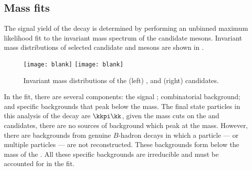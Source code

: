 \subsection{Mass fits}
\label{sec:dsphi:fit}

The signal yield of the decay \btodsphi is determined by performing an unbinned maximum likelihood
fit to the invariant mass spectrum of the candidate \Bp mesons.
Invariant mass distributions of
selected candidate \Ds and \phii mesons are shown in .

\begin{figure}
  \begin{center}
    \texttt{[image: blank]}
    \texttt{[image: blank]}
    \caption{\small
      Invariant mass distributions of the
      (left) \Ds, and
      (right) \phii candidates.
    }
    \label{fig:dsphi:mesons}
  \end{center}
\end{figure}


In the fit, there are several components: the signal \btodsphi; combinatorial background; and
specific backgrounds that peak below the \Bp mass.
The final state particles in this analysis of the decay \btodsphi are $\kkpi\kk$, given the mass
cuts on the \Ds and \phii candidates, there are no sources of background which peak at the \Bp
mass.
However, there are backgrounds from genuine $B$-hadron decays in which a particle --- or multiple
particles --- are not reconstructed.
These backgrounds form below the mass of the \Bp.
All these specific backgrounds are irreducible and must be accounted for in the fit.

